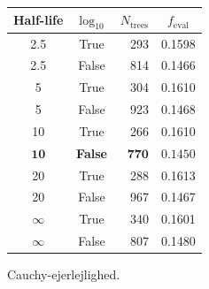 

\begin{margintable}
  \begin{tabular}{@{}ccrc@{}}
    Half-life & $\log_{10}$ & $N_\mathrm{trees}$ & $f_\mathrm{eval}$ \\
    \midrule
    \num{2.5} & True & \num{293} & \num{0.1598} \\
    \num{2.5} & False & \num{814} & \num{0.1466} \\
    \num{5} & True & \num{304} & \num{0.1610} \\
    \num{5} & False & \num{923} & \num{0.1468} \\
    \num{10} & True & \num{266} & \num{0.1610} \\
    $\mathbf{10}$ & \textbf{False} & $\mathbf{770}$ & $\mathbf{0.1450}$ \\
    \num{20} & True & \num{288} & \num{0.1613} \\
    \num{20} & False & \num{967} & \num{0.1467} \\
    $\infty$ & True & \num{340} & \num{0.1601} \\
    $\infty$ & False & \num{807} & \num{0.1480} \\
  \end{tabular}
  \caption{\label{tab:h:HPO_initial_Cauchy-ejerlejlighed}Cauchy-ejerlejlighed.}
\end{margintable}



